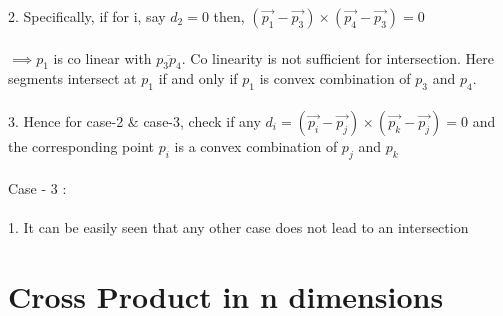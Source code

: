 \documentclass{article}
\begin{document}
    2. Specifically, if for i, say $d_2 = 0$ then,  $(\Vec{p_{1}}-\Vec{p_{3}}) \times (\Vec{p_{4}}-\Vec{p_{3}}) = 0$ \\ \\
    $\implies p_1 $ is co linear with $\overline{p_3p_4}$. Co linearity is not  sufficient for intersection. Here segments intersect at $p_1$ if and only if $p_1$ is convex combination of $p_{3}$ and $p_4$. \\ \\
    3. Hence for case-2 \& case-3, check if any $d_i = (\Vec{p_i}-\Vec{p_j}) \times (\Vec{p_k}-\Vec{p_j}) = 0$ and the corresponding point $p_i$ is a convex combination of $p_j$ and $p_k$ \\ \\
    Case - 3 : \\ \\
    1. It can be easily seen that any other case does not lead to an intersection

    \section{Cross Product in n dimensions}   
\end{document}
